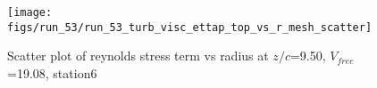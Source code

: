 \begin{figure}[H]
\centering
\texttt{[image: figs/run\_53/run\_53\_turb\_visc\_ettap\_top\_vs\_r\_mesh\_scatter]}
\caption{Scatter plot of reynolds stress term vs radius at $z/c$=9.50, $V_{free}$=19.08, station6}
\label{fig:run_53_turb_visc_ettap_top_vs_r_mesh_scatter}
\end{figure}


